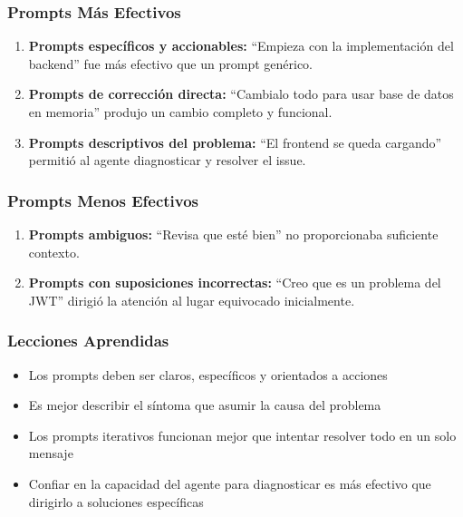 \documentclass[11pt,a4paper]{article}
\begin{document}
\subsubsection{Prompts Más Efectivos}

\begin{enumerate}
    \item \textbf{Prompts específicos y accionables:} ``Empieza con la implementación del backend'' fue más efectivo que un prompt genérico.
    
    \item \textbf{Prompts de corrección directa:} ``Cambialo todo para usar base de datos en memoria'' produjo un cambio completo y funcional.
    
    \item \textbf{Prompts descriptivos del problema:} ``El frontend se queda cargando'' permitió al agente diagnosticar y resolver el issue.
\end{enumerate}

\subsubsection{Prompts Menos Efectivos}

\begin{enumerate}
    \item \textbf{Prompts ambiguos:} ``Revisa que esté bien'' no proporcionaba suficiente contexto.
    
    \item \textbf{Prompts con suposiciones incorrectas:} ``Creo que es un problema del JWT'' dirigió la atención al lugar equivocado inicialmente.
\end{enumerate}

\subsubsection{Lecciones Aprendidas}

\begin{itemize}
    \item Los prompts deben ser claros, específicos y orientados a acciones
    \item Es mejor describir el síntoma que asumir la causa del problema
    \item Los prompts iterativos funcionan mejor que intentar resolver todo en un solo mensaje
    \item Confiar en la capacidad del agente para diagnosticar es más efectivo que dirigirlo a soluciones específicas
\end{itemize}
\end{document}
